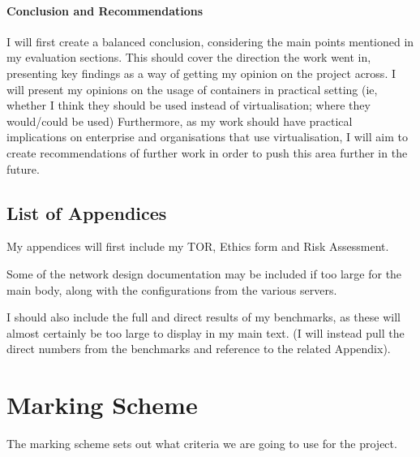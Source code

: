 \paragraph{Conclusion and Recommendations} I will first create a balanced conclusion, considering the main points mentioned in my evaluation sections. This should cover the direction the work went in, presenting key findings as a way of getting my opinion on the project across. I will present my opinions on the usage of containers in practical setting (ie, whether I think they should be used instead of virtualisation; where they would/could be used) Furthermore, as my work should have practical implications on enterprise and organisations that use virtualisation, I will aim to create recommendations of further work in order to push this area further in the future.




\subsection{List of Appendices}
My appendices will first include my TOR, Ethics form and Risk Assessment.

Some of the network design documentation may be included if too large for the main body, along with the configurations from the various servers.

I should also include the full and direct results of my benchmarks, as these will almost certainly be too large to display in my main text. (I will instead pull the direct numbers from the benchmarks and reference to the related Appendix).





\section{Marking Scheme}
The marking scheme sets out what criteria we are going to use for the project.

